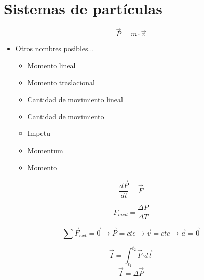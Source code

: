 \section{Sistemas de partículas}

        \begin{equation}
            \vec{P} = m \cdot \vec{v}        
        \end{equation}
        \begin{itemize}
        \item Otros nombres posibles...
            \begin{itemize}
            \item Momento lineal
            \item Momento traslacional
            \item Cantidad de movimiento lineal
            \item Cantidad de movimiento
            \item Impetu
            \item Momentum
            \item Momento
            \end{itemize}
        \end{itemize}
        
        \begin{equation}
            \frac{d\vec{P}}{dt} = \vec{F}
        \end{equation}

        \begin{equation}
            F_{med} = \frac{\Delta P}{\Delta T}
        \end{equation}
    
        \begin{equation}
            \sum \vec{F}_{ext}=\vec{0} \rightarrow \vec{P}=cte \rightarrow \vec{v}=cte \rightarrow \vec{a}=\vec{0}
        \end{equation}
    
        \begin{equation}
            \vec{I}=\int_{t_1}^{t_2} \Vec{F} \boldsymbol{\cdot} d\vec{t}
        \end{equation}
        \begin{equation}
            \vec{I} = \Delta \vec{P}        
        \end{equation}
    
